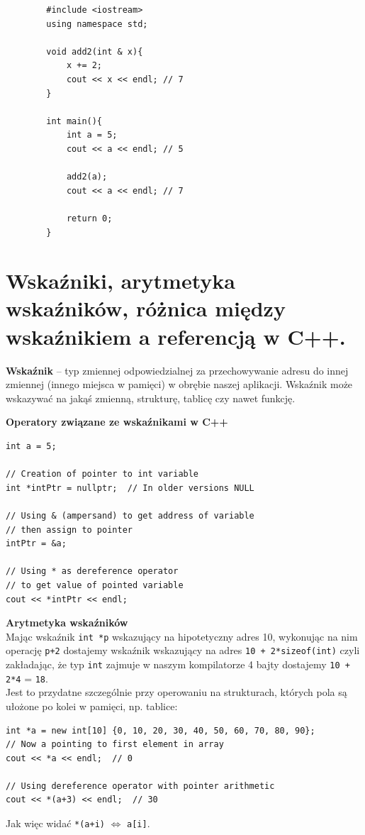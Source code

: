 \documentclass[12pt]{article}
\begin{document}
    \begin{verbatim}
        #include <iostream>
        using namespace std;

        void add2(int & x){
            x += 2;
            cout << x << endl; // 7
        }

        int main(){
            int a = 5;
            cout << a << endl; // 5

            add2(a);
            cout << a << endl; // 7

            return 0;
        }
    \end{verbatim}

    \newpage

    \section{Wskaźniki, arytmetyka wskaźników, różnica między wskaźnikiem a referencją w C++.}
    \begin{definition}
    	\textbf{Wskaźnik} – typ zmiennej odpowiedzialnej za przechowywanie adresu do innej zmiennej (innego miejsca w pamięci) w obrębie naszej aplikacji.
    	Wskaźnik może wskazywać na jakąś zmienną, strukturę, tablicę czy nawet funkcję.
    \end{definition}
    
    \begin{definition}
    	\textbf{Operatory związane ze wskaźnikami w C++}
    	\begin{verbatim}
int a = 5;

// Creation of pointer to int variable
int *intPtr = nullptr;  // In older versions NULL

// Using & (ampersand) to get address of variable
// then assign to pointer
intPtr = &a;

// Using * as dereference operator
// to get value of pointed variable
cout << *intPtr << endl;
    	\end{verbatim}
    \end{definition}
    
    \begin{definition}
    	\textbf{Arytmetyka wskaźników} \\
    	Mając wskaźnik \texttt{int *p} wskazujący na hipotetyczny adres 10, wykonując na nim operację \texttt{p+2} dostajemy wskaźnik wskazujący na adres \texttt{10 + 2*sizeof(int)}
    	czyli zakładając, że typ \texttt{int} zajmuje w naszym kompilatorze 4 bajty dostajemy \texttt{10 + 2*4} = \texttt{18}. \\
    	Jest to przydatne szczególnie przy operowaniu na strukturach, których pola są ułożone po kolei w pamięci, np. tablice:
    	\begin{verbatim}
int *a = new int[10] {0, 10, 20, 30, 40, 50, 60, 70, 80, 90};
// Now a pointing to first element in array
cout << *a << endl;  // 0

// Using dereference operator with pointer arithmetic
cout << *(a+3) << endl;  // 30
    	\end{verbatim}
    	Jak więc widać \texttt{*(a+i)} $\Leftrightarrow$ \texttt{a[i]}.
    \end{definition}
    
\end{document}

